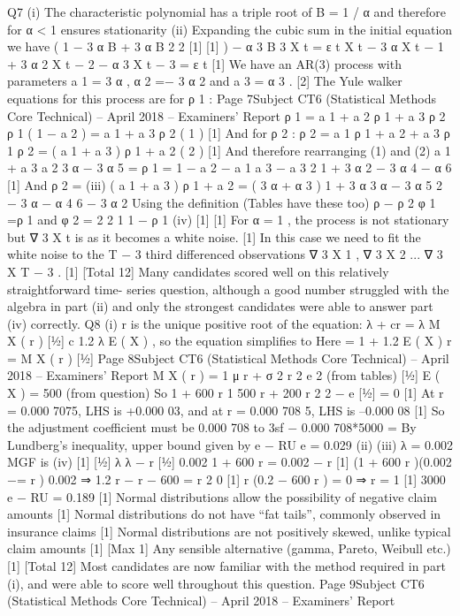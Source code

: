 \documentclass[a4paper,12pt]{article}
\begin{document}
Q7
(i) The characteristic polynomial has a triple root of B = 1 / α
and therefore for α < 1 ensures stationarity
(ii) Expanding the cubic sum in the initial equation we have
( 1 − 3 α B + 3 α B
2 2
[1]
[1]
)
− α 3 B 3 X t = ε t
X t − 3 α X t − 1 + 3 α 2 X t − 2 − α 3 X t − 3 = ε t
[1]
We have an AR(3) process with parameters a 1 = 3 α , α 2 =− 3 α 2 and a 3 = α 3
.
[2]
The Yule walker equations for this process are for ρ 1 :
Page 7Subject CT6 (Statistical Methods Core Technical) – April 2018 – Examiners’ Report
ρ 1 = a 1 + a 2 ρ 1 + a 3 ρ 2
ρ 1 ( 1 − a 2 ) =           
a 1 + a 3 ρ 2
( 1 )
[1]
And for ρ 2 :
ρ 2 = a 1 ρ 1 + a 2 + a 3 ρ 1
ρ 2 =
( a 1 + a 3 ) ρ 1 + a 2           ( 2 )
[1]
And therefore rearranging (1) and (2)
a 1 + a 3 a 2
3 α − 3 α 5
=
ρ 1
=
1 − a 2 − a 1 a 3 − a 3 2 1 + 3 α 2 − 3 α 4 − α 6
[1]
And
ρ 2 =
(iii)
( a 1 + a 3 ) ρ 1 + a 2 =
(
3 α + α 3
) 1 + 3 α
3 α − 3 α 5
2
− 3 α − α
4
6
− 3 α 2
Using the definition (Tables have these too)
ρ − ρ 2
φ 1 =ρ 1   
and φ 2 = 2 2 1
1 − ρ 1
(iv)
[1]
[1]
For α = 1 , the process is not stationary but ∇ 3 X t is as it becomes a white
noise.
[1]
In this case we need to fit the white noise to the T − 3 third differenced
observations ∇ 3 X 1 , ∇ 3 X 2 ... ∇ 3 X T − 3 .
[1]
[Total 12]
Many candidates scored well on this relatively straightforward time-
series question, although a good number struggled with the algebra in
part (ii) and only the strongest candidates were able to answer part (iv)
correctly.
Q8
(i)
r is the unique positive root of the equation:
λ + cr = λ M X ( r )
[1⁄2]
c 1.2 λ E ( X ) , so the equation simplifies to
Here =
1 + 1.2 E ( X ) r =
M X ( r )
[1⁄2]
Page 8Subject CT6 (Statistical Methods Core Technical) – April 2018 – Examiners’ Report
M X ( r ) =
1
μ r + σ 2 r 2
e 2
(from tables)
[1⁄2]
E ( X ) = 500 (from question)
So 1 + 600 r
1
500 r + 200 r 2
2
− e
[1⁄2]
= 0
[1]
At r = 0.000 7075, LHS is +0.000 03, and at r = 0.000 708 5, LHS is
–0.000 08
[1]
So the adjustment coefficient must be 0.000 708 to 3sf
− 0.000 708*5000
=
By Lundberg’s inequality, upper bound given
by e − RU e =
0.029
(ii)
(iii)
λ = 0.002
MGF is
(iv)
[1]
[1⁄2]
λ
λ − r
[1⁄2]
0.002
1 + 600 r =
0.002 − r [1]
(1 + 600 r )(0.002 −=
r ) 0.002 ⇒ 1.2 r − r − 600 =
r 2 0 [1]
r (0.2 − 600 r ) = 0 ⇒ r = 1 [1]
3000
e − RU = 0.189 [1]
Normal distributions allow the possibility of negative claim amounts [1]
Normal distributions do not have “fat tails”, commonly observed in insurance
claims
[1]
Normal distributions are not positively skewed, unlike typical claim amounts
[1]
[Max 1]
Any sensible alternative (gamma, Pareto, Weibull etc.)
[1]
[Total 12]
Most candidates are now familiar with the method required in part (i),
and were able to score well throughout this question.
Page 9Subject CT6 (Statistical Methods Core Technical) – April 2018 – Examiners’ Report
\end{document}
